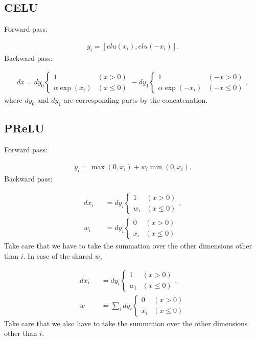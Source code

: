\documentclass{article}
\begin{document}
\subsection{CELU}

Forward pass:

\begin{eqnarray}
  y_i= [elu(x_i), elu(-x_i)].
\end{eqnarray}
%
Backward pass:

\begin{eqnarray}
  dx = 
  dy_0 \left\{
  \begin{array}{ll}
    1 & (x > 0)\\
    \alpha \exp(x_i) & (x \leq 0)
  \end{array} \right. 
  - 
  dy_1 \left\{
  \begin{array}{ll}
    1 & (-x > 0)\\
    \alpha \exp(-x_i) & (-x \leq 0)
  \end{array} \right.,
\end{eqnarray}
%
where $dy_0$ and $dy_1$ are corresponding parts by the concatenation.

\subsection{PReLU}

Forward pass:

\begin{eqnarray}
  y_i = \max(0, x_i) + w_i \min(0, x_i).
\end{eqnarray}
%
Backward pass:

\begin{eqnarray}
  dx_i &&= dy_i \left\{
  \begin{array}{ll}
    1   & (x > 0)\\
    w_i & (x \leq 0)
  \end{array} \right., \\
  w_i &&= dy_i \left\{
  \begin{array}{ll}
    0   & (x > 0)\\
    x_i & (x \leq 0)
  \end{array} \right.
\end{eqnarray}
%
Take care that we have to take the summation over the other dimensions other than $i$.
%
In case of the shared $w$,

\begin{eqnarray}
  dx_i &&= dy_i \left\{
  \begin{array}{ll}
    1   & (x > 0)\\
    w_i & (x \leq 0)
  \end{array} \right., \\
  w &&= \sum_ i dy_i \left\{
  \begin{array}{ll}
    0   & (x > 0)\\
    x_i & (x \leq 0)
  \end{array} \right.
\end{eqnarray}
%
Take care that we also have to take the summation over the other dimensions other than $i$.
\end{document}
